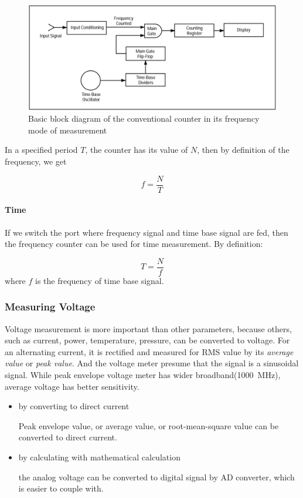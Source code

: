 \begin{figure}
  \centering
  \includegraphics[width=4.5in]{fig/freq_counter.png}
  \caption{Basic block diagram of the conventional counter in its frequency mode of measurement}\label{fig_freq_counter}
\end{figure}

In a specified period $T$, the counter has its value of $N$, then by definition of the frequency, we get

$$f=\frac{N}{T}$$

\paragraph{Time} If we switch the port where frequency signal and time base signal are fed, then the frequency counter can be used for time measurement. By definition:

$$T=\frac{N}{f}$$
where $f$ is the frequency of time base signal.

\subsubsection{Measuring Voltage}

Voltage measurement is more important than other parameters, because others, such as current, power, temperature, pressure, can be converted to voltage.
For an alternating current, it is rectified and measured for RMS value by its \emph{average value} or \emph{peak value}. And the voltage meter presume that the signal is a sinusoidal signal. While peak envelope voltage meter has wider broadband(\SI{1000}{\mega\hertz}), average voltage has better sensitivity.

\begin{itemize}
  \item by converting to direct current

  Peak envelope value, or average value, or root-mean-square value can be converted to direct current.

  \item by calculating with mathematical calculation

  the analog voltage can be converted to digital signal by AD converter, which is easier to couple with.
\end{itemize}

